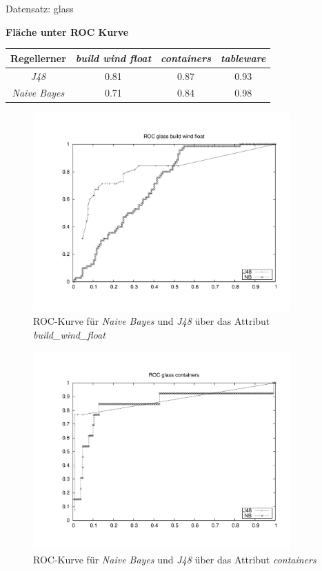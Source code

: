 Datensatz: glass

\textbf{Fl\"ache unter ROC Kurve}
\begin{table}[htb]
	\centering
\begin{tabular}{c|c|c|c}
				Regellerner       & \emph{build wind float} & \emph{containers} & \emph{tableware}  \\ \hline
				\emph{J48}			& 0.81 & 0.87 & 0.93  \\ \hline
				\emph{Naive Bayes}  & 0.71 & 0.84 & 0.98  
\end{tabular}
\end{table}

\begin{figure}[htbp]
	\centering
		\includegraphics[height=3in]{pics/a3/ROC_glass_build_wind_float.pdf}
	\caption{ROC-Kurve f\"ur \emph{Naive Bayes} und \emph{J48} \"uber das Attribut \emph{build\_wind\_float}}
\end{figure}

\begin{figure}[htbp]
	\centering
		\includegraphics[height=3in]{pics/a3/ROC_glass_containers.pdf}
	\caption{ROC-Kurve f\"ur \emph{Naive Bayes} und \emph{J48} \"uber das Attribut \emph{containers}}
\end{figure}


